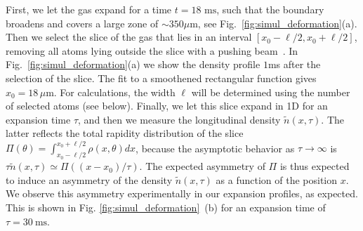 		First, we let the gas expand for a time $t=18 \mbox{ ms}$, such that the boundary broadens and covers a large zone of $\sim 350 \mu$m, see Fig.~\ref{fig:simul_deformation}(a).
		Then we select the slice of the gas that lies in an interval  $[x_0-\ell/2, x_0+\ell/2]$, removing all atoms lying outside the slice with a pushing beam~\cite{dubois_probing_2024}.
		In Fig.~\ref{fig:simul_deformation}(a) we show the density profile $1$ms after the selection of the slice.
		The fit to a smoothened rectangular  function gives $x_0= 18\,\mu$m.
		For calculations, the width $\ell$ will be determined using the 
		number of selected atoms (see below).
		Finally, we let this slice expand in 1D for an expansion time $\tau$, and then we measure the longitudinal density $\tilde{n}(x, {\tau} )$.  The latter reflects the total rapidity distribution of the slice $\Pi(\theta)=\int_{x_0-\ell/2}^{x_0+\ell/2}  \rho(x,\theta) dx$, because the asymptotic behavior as $\tau\rightarrow \infty$ is $ %
		\tau \tilde{n}(x, {\tau} ) \simeq \Pi((x-x_0)/\tau)$.  The 
		expected asymmetry of $\Pi$ is thus expected to induce an asymmetry of the density $\tilde{n}(x,\tau)$ as a function of the position $x$. We observe this asymmetry experimentally in our expansion profiles, as expected. This is shown in Fig. \ref{fig:simul_deformation}~(b) for an expansion time of $\tau=30~\mbox{ms}$.
		
		\begin{figure}[!htb]
		
		\end{figure} 
		

